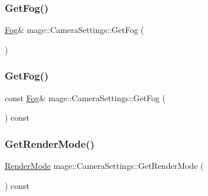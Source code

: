 \hypertarget{classmage_1_1_camera_settings_ae1ba03a765f304703502bcd7de15d436}{}\label{classmage_1_1_camera_settings_ae1ba03a765f304703502bcd7de15d436} 
\subsubsection{\texorpdfstring{Get\+Fog()}{GetFog()}\hspace{0.1cm}{\footnotesize\ttfamily [1/2]}}
{\footnotesize\ttfamily \hyperlink{classmage_1_1_fog}{Fog}\& mage\+::\+Camera\+Settings\+::\+Get\+Fog (\begin{DoxyParamCaption}{ }\end{DoxyParamCaption})\hspace{0.3cm}{\ttfamily [noexcept]}}

\hypertarget{classmage_1_1_camera_settings_a84098b0518f7eada941944b8155372a8}{}\label{classmage_1_1_camera_settings_a84098b0518f7eada941944b8155372a8} 
\subsubsection{\texorpdfstring{Get\+Fog()}{GetFog()}\hspace{0.1cm}{\footnotesize\ttfamily [2/2]}}
{\footnotesize\ttfamily const \hyperlink{classmage_1_1_fog}{Fog}\& mage\+::\+Camera\+Settings\+::\+Get\+Fog (\begin{DoxyParamCaption}{ }\end{DoxyParamCaption}) const\hspace{0.3cm}{\ttfamily [noexcept]}}

\hypertarget{classmage_1_1_camera_settings_a6673291bcfed8fa2c0a0041bf8f97f24}{}\label{classmage_1_1_camera_settings_a6673291bcfed8fa2c0a0041bf8f97f24} 
\subsubsection{\texorpdfstring{Get\+Render\+Mode()}{GetRenderMode()}}
{\footnotesize\ttfamily \hyperlink{namespacemage_a9d24b35ed0bdecf8535e2b91fe0eebba}{Render\+Mode} mage\+::\+Camera\+Settings\+::\+Get\+Render\+Mode (\begin{DoxyParamCaption}{ }\end{DoxyParamCaption}) const\hspace{0.3cm}{\ttfamily [noexcept]}}

